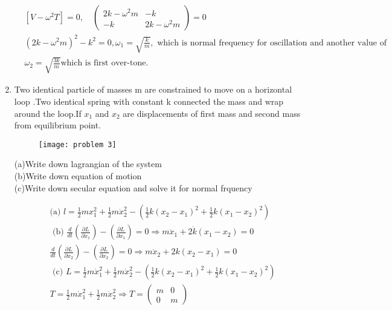 \begin{enumerate}
\begin{answer}
\begin{align*}
	&\left[V-\omega^{2} T\right]=0, \quad\left(\begin{array}{cc}
	2 k-\omega^{2} m & -k \\
	-k & 2 k-\omega^{2} m
	\end{array}\right)=0\\
	&\left(2 k-\omega^{2} m\right)^{2}-k^{2}=0, \omega_{1}=\sqrt{\frac{k}{m}},\text{ which is normal frequency for oscillation and another value of}\\ &\omega_{2}=\sqrt{\frac{3 k}{m}} \text{which is first over-tone.}
	\end{align*}
\end{answer}
\item Two identical particle of masses m are constrained to move on a horizontal loop .Two identical spring with constant k connected the mass and wrap around the loop.If $x_1$ and $x_2$ are displacements of first mass and second mass from equilibrium point.\\
\begin{figure}[H]
	\centering
	\texttt{[image: problem 3]}
\end{figure}
(a)Write down lagrangian of the system \\
(b)Write down equation of motion\\
(c)Write down secular equation and solve it for normal frquency
\begin{answer}
	\begin{align*}
	&\text {(a) } l=\frac{1}{2} m x_{1}^{2}+\frac{1}{2} m \dot{x}_{2}^{2}-\left(\frac{1}{2} k\left(x_{2}-x_{1}\right)^{2}+\frac{1}{2} k\left(x_{1}-x_{2}\right)^{2}\right)\\
	&\text { (b) } \frac{d}{d t}\left(\frac{\partial L}{\partial \dot{x}_{1}}\right)-\left(\frac{\partial L}{\partial x_{1}}\right)=0 \Rightarrow m \ddot{x}_{1}+2 \dot{k}\left(x_{1}-x_{2}\right)=0\\
	&\frac{d}{d t}\left(\frac{\partial L}{\partial x_{2}}\right)-\left(\frac{\partial L}{\partial x_{2}}\right)=0 \Rightarrow m \ddot{x}_{2}+2 k\left(x_{2}-x_{1}\right)=0\\
	&\text { (c) } L=\frac{1}{2} m \dot{x}_{1}^{2}+\frac{1}{2} m \dot{x}_{2}^{2}-\left(\frac{1}{2} k\left(x_{2}-x_{1}\right)^{2}+\frac{1}{2} k\left(x_{1}-x_{2}\right)^{2}\right)\\
	&T=\frac{1}{2} m \dot{x}_{1}^{2}+\frac{1}{2} m \dot{x}_{2}^{2} \Rightarrow T=\left(\begin{array}{cc}
	m & 0 \\
	0 & m
	\end{array}\right)\\

\end{align*}
\end{answer}
\end{enumerate}
